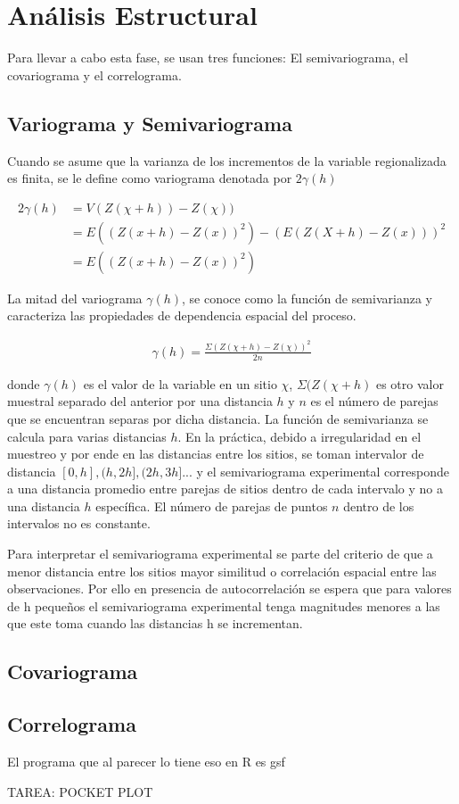 \section{Análisis Estructural}

Para llevar a cabo esta fase, se usan tres funciones: El semivariograma, el covariograma y el correlograma. \cite{giraldo}  

\subsection{Variograma y Semivariograma}

Cuando se asume que la varianza de los incrementos de la variable regionalizada es finita, se le define como variograma denotada por $2\gamma(h)$ 

\begin{equation*}
\begin{aligned}
   2\gamma(h) & = V(Z(\chi + h)) - Z(\chi))\\
  & = E((Z(x + h) - Z(x))^2) - (E(Z(X + h) - Z(x)))^2 \\
  & = E((Z(x + h) - Z(x))^2)
\end{aligned}
\end{equation*}

La mitad del variograma $\gamma(h)$, se conoce como la función de semivarianza y caracteriza las propiedades de dependencia espacial del proceso. 

\begin{equation*}
\begin{aligned}
   \gamma(h)  = \frac{\Sigma(Z(\chi + h) - Z(\chi))^2}{2n}
\end{aligned}
\end{equation*}


donde $\gamma(h) $ es el valor de la variable en un sitio $\chi$, $\Sigma(Z(\chi + h) $ es otro valor muestral separado del anterior por una distancia $h$ y $n$ es el número de parejas que se encuentran separas por dicha distancia. La función de semivarianza se calcula para varias distancias $h$. En la práctica, debido a irregularidad en el muestreo y por ende en las distancias entre los sitios, se toman intervalor de distancia $[0,h], (h,2h], (2h, 3h]$... y el semivariograma experimental corresponde a una distancia promedio entre parejas de sitios dentro de cada intervalo y no a una distancia $h$ específica. El número de parejas de puntos $n$ dentro de los intervalos no es constante.

Para interpretar el semivariograma experimental se parte del criterio de que a menor distancia entre los sitios mayor similitud o correlación espacial entre las observaciones. Por ello en presencia de autocorrelación se espera que para valores de h pequeños el semivariograma experimental tenga magnitudes menores a las que este toma cuando las distancias h se incrementan.

\subsection{Covariograma}




\subsection{Correlograma}
El programa que al parecer lo tiene eso en R es gsf


TAREA: POCKET PLOT 




